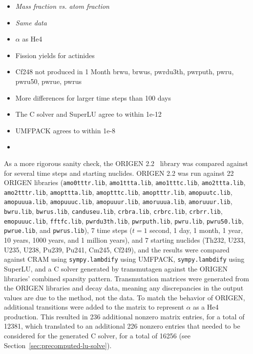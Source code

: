 \begin{itemize}
\item \it{Mass fraction vs. atom fraction}
\item {\it Same data}
\item $\alpha$ as He4
\item Fission yields for actinides
\item Cf248 not produced in 1 Month brwu, brwus, pwrdu3th, pwrputh, pwru,
  pwru50, pwrue, pwrus
\item More differences for larger time steps than 100 days
\item The C solver and SuperLU agree to within 1e-12
\item UMFPACK agrees to within 1e-8
\item {}
\end{itemize}

As a more rigorous sanity check, the ORIGEN 2.2~\cite{ationneeded} library was
compared against for several time steps and starting nuclides. ORIGEN 2.2 was
run against 22 ORIGEN libraries (\texttt{amo0tttr.\allowbreak{}lib},
\texttt{amo1ttta.\allowbreak{}lib}, \texttt{amo1tttc.\allowbreak{}lib},
\texttt{amo2ttta.\allowbreak{}lib}, \texttt{amo2tttr.\allowbreak{}lib},
\texttt{amopttta.\allowbreak{}lib}, \texttt{amoptttc.\allowbreak{}lib},
\texttt{amoptttr.\allowbreak{}lib}, \texttt{amopuutc.\allowbreak{}lib},
\texttt{amopuuua.\allowbreak{}lib}, \texttt{amopuuuc.\allowbreak{}lib},
\texttt{amopuuur.\allowbreak{}lib}, \texttt{amoruuua.\allowbreak{}lib},
\texttt{amoruuur.\allowbreak{}lib}, \texttt{bwru.\allowbreak{}lib},
\texttt{bwrus.\allowbreak{}lib}, \texttt{canduseu.\allowbreak{}lib},
\texttt{crbra.\allowbreak{}lib}, \texttt{crbrc.\allowbreak{}lib},
\texttt{crbrr.\allowbreak{}lib}, \texttt{emopuuuc.\allowbreak{}lib},
\texttt{fftfc.\allowbreak{}lib}, \texttt{pwrdu3th.\allowbreak{}lib},
\texttt{pwrputh.\allowbreak{}lib}, \texttt{pwru.\allowbreak{}lib},
\texttt{pwru50.\allowbreak{}lib}, \texttt{pwrue.\allowbreak{}lib}, and
\texttt{pwrus.\allowbreak{}lib}), 7 time steps ($t= 1$ second, 1 day, 1 month,
1 year, 10 years, 1000 years, and 1 million years), and 7 starting nuclides
(Th232, U233, U235, U238, Pu239, Pu241, Cm245, Cf249), and the results were
compared against CRAM using \texttt{sympy.\allowbreak{}lambdify} using
UMFPACK, \texttt{sympy.\allowbreak{}lambdify} using SuperLU, and a C solver
generated by transmutagen against the ORIGEN libraries' combined sparsity
pattern. Transmutation matrices were generated from the ORIGEN libraries and
decay data, meaning any discrepancies in the output values are due to the
method, not the data. To match the behavior of ORIGEN, additional transitions
were added to the matrix to represent $\alpha$ as a He4 production. This
resulted in 236 additional nonzero matrix entries, for a total of 12381, which
translated to an additional 226 nonzero entries that needed to be considered
for the generated C solver, for a total of 16256 (see
Section~\ref{sec:precomputed-lu-solve}).

